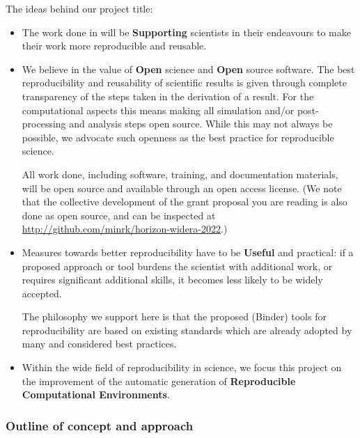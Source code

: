   The ideas behind our project title:
\begin{itemize}
\item The work done in \TheProject will be \textbf{Supporting} scientists in their
  endeavours to make their work more reproducible and reusable.
\item We believe in the value of \textbf{Open} science and \textbf{Open} source software.
  The best reproducibility and reusability of scientific results is given through
  complete transparency of the steps taken in the derivation of a result. For
  the computational aspects this means making all simulation and/or
  post-processing and analysis steps open source. While this may not always be
  possible, we advocate such openness as the best practice for reproducible science.

  All work done, including software, training, and documentation materials, will
  be open source and available through an open access license. (We note that the
  collective development of the grant proposal you are reading is also done as
  open source, and can be inspected at \url{http://github.com/minrk/horizon-widera-2022}.)

\item Measures towards better reproducibility have to be \textbf{Useful} and
  practical: if a proposed approach or tool burdens the scientist with
  additional work, or requires significant additional skills, it becomes less
  likely to be widely accepted.

  The philosophy we support here is that the proposed (Binder) tools for
  reproducibility are based on existing standards which are already
  adopted by many and considered best practices.

\item Within the wide field of reproducibility in science, we focus this
  project on the improvement of the automatic generation of \textbf{Reproducible
    Computational Environments}.
\end{itemize}

\subsubsection{Outline of concept and approach}

